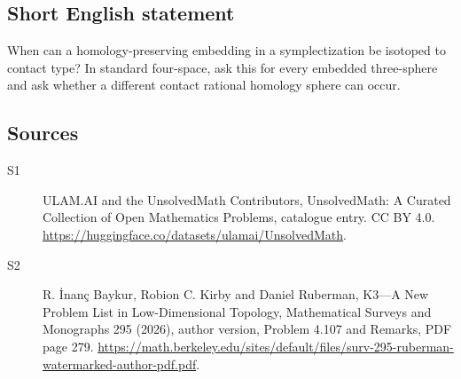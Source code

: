 \documentclass[11pt]{article}
\begin{document}
\subsection{Short English statement}
When can a homology-preserving embedding in a symplectization be isotoped to contact type? In standard four-space, ask this for every embedded three-sphere and ask whether a different contact rational homology sphere can occur.
\subsection{Sources}
\begin{description}
\item[\hypertarget{source:statement:1}{S1}] ULAM.AI and the UnsolvedMath Contributors, UnsolvedMath: A Curated Collection of Open Mathematics Problems, catalogue entry. CC BY 4.0. \url{https://huggingface.co/datasets/ulamai/UnsolvedMath}.
\item[\hypertarget{source:statement:2}{S2}] R. İnanç Baykur, Robion C. Kirby and Daniel Ruberman, K3—A New Problem List in Low-Dimensional Topology, Mathematical Surveys and Monographs 295 (2026), author version, Problem 4.107 and Remarks, PDF page 279. \url{https://math.berkeley.edu/sites/default/files/surv-295-ruberman-watermarked-author-pdf.pdf}.
\end{description}
\label{end:statement}
\end{document}
